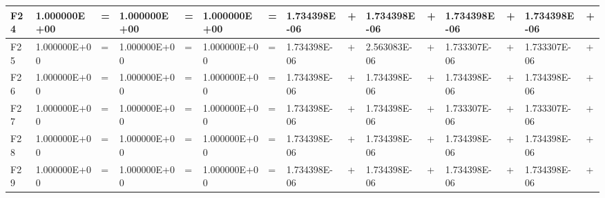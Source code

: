 \documentclass{article} %
\begin{document}
\begin{tabular}{|p{0.3in}|p{0.5in}|p{0.2in}|p{0.5in}|p{0.2in}|p{0.6in}|p{0.1in}|p{0.6in}|p{0.1in}|p{0.5in}|p{0.1in}|p{0.5in}|p{0.1in}|p{0.5in}|p{0.2in}|}
F24 & 1.000000E+00 & = & 1.000000E+00 & = & 1.000000E+00 & = & 1.734398E-06 & + & 1.734398E-06 & + & 1.734398E-06 & + & 1.734398E-06 & + \\ \hline 
F25 & 1.000000E+00 & = & 1.000000E+00 & = & 1.000000E+00 & = & 1.734398E-06 & + & 2.563083E-06 & + & 1.733307E-06 & + & 1.733307E-06 & + \\ \hline 
F26 & 1.000000E+00 & = & 1.000000E+00 & = & 1.000000E+00 & = & 1.734398E-06 & + & 1.734398E-06 & + & 1.734398E-06 & + & 1.734398E-06 & + \\ \hline 
F27 & 1.000000E+00 & = & 1.000000E+00 & = & 1.000000E+00 & = & 1.734398E-06 & + & 1.734398E-06 & + & 1.733307E-06 & + & 1.733307E-06 & + \\ \hline 
F28 & 1.000000E+00 & = & 1.000000E+00 & = & 1.000000E+00 & = & 1.734398E-06 & + & 1.734398E-06 & + & 1.734398E-06 & + & 1.734398E-06 & + \\ \hline 
F29 & 1.000000E+00 & = & 1.000000E+00 & = & 1.000000E+00 & = & 1.734398E-06 & + & 1.734398E-06 & + & 1.734398E-06 & + & 1.734398E-06 & + \\ \hline 
\end{tabular}
\end{document}
